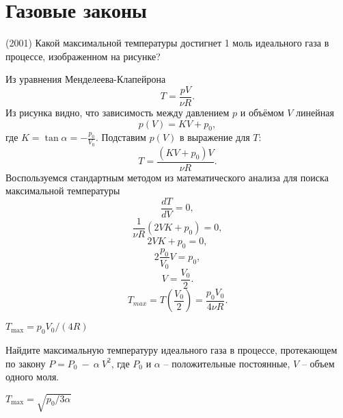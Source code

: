 \section{Газовые законы}

\begin{ex} 
(2001) Какой максимальной температуры достигнет 1 моль идеального газа в процессе, изображенном на рисунке? 
\begin{center}

\end{center}
\begin{sol}
Из уравнения Менделеева-Клапейрона $$T = \frac{pV}{\nu R}.$$
Из рисунка видно, что зависимость между давлением $p$ и объёмом $V$ линейная $$p(V)=KV+p_{0},$$ где $K = \tan \alpha = - \frac{p_{0}}{V_{0}}.$
Подставим $p(V)$ в выражение для $T$: 	$$T = \frac{(KV+p_{0})V}{\nu R}.$$
Воспользуемся стандартным методом из математического анализа для поиска максимальной температуры $$\frac{dT}{dV} = 0,$$ $$\frac{1}{\nu R}(2VK+p_{0})=0,$$ $$2VK+p_{0}=0,$$ $$2\frac{p_{0}}{V_{0}}V=p_{0},$$ $$V=\frac{V_{0}}{2}.$$
$$T_{max} = T\left(\frac{V_{0}}{2}\right)=\frac{p_{0}V_{0}}{4\nu R}.$$
\end{sol}
\begin{ans}
$T_{\max}=p_0V_0/(4R)$
\end{ans}
\end{ex}

\begin{ex}
Найдите максимальную температуру идеального газа в процессе, протекающем по закону $P=P_0~-~\alpha~V^2$, где $P_0$ и $\alpha$ -- положительные постоянные, $V$ -- объем одного моля.
\begin{ans}
$T_{\max} = \sqrt{p_0/3\alpha}$
\end{ans}
\end{ex}

